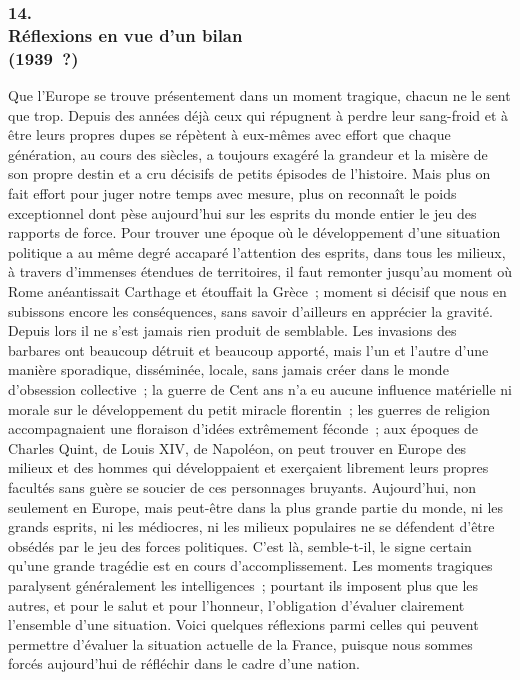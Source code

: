 \documentclass[french,twoside]{book} %
\begin{document}
\subsubsection[14. Réflexions en vue d’un bilan, (1939 ?)]{14. \\
Réflexions en vue d’un bilan \\
(1939 ?)}
\noindent \par
Que l'Europe se trouve présentement dans un moment tragique, chacun ne le sent que trop. Depuis des années déjà ceux qui répugnent à perdre leur sang-froid et à être leurs propres dupes se répètent à eux-mêmes avec effort que chaque génération, au cours des siècles, a toujours exagéré la grandeur et la misère de son propre destin et a cru décisifs de petits épisodes de l'histoire. Mais plus on fait effort pour juger notre temps avec mesure, plus on reconnaît le poids exceptionnel dont pèse aujourd'hui sur les esprits du monde entier le jeu des rapports de force. Pour trouver une époque où le développement d'une situation politique a au même degré accaparé l'attention des esprits, dans tous les milieux, à travers d'immenses étendues de territoires, il faut remonter jusqu'au moment où Rome anéantissait Carthage et étouffait la Grèce ; moment si décisif que nous en subissons encore les conséquences, sans savoir d'ailleurs en apprécier la gravité. Depuis lors il ne s'est jamais rien produit de semblable. Les invasions des barbares ont beaucoup détruit et beaucoup apporté, mais l'un et l'autre d'une manière sporadique, disséminée, locale, sans jamais créer dans le monde d'obsession collective ; la guerre de Cent ans n'a eu aucune influence matérielle ni morale sur le développement du petit miracle florentin ; les guerres de religion accompagnaient une floraison d'idées extrêmement féconde ; aux époques de Charles Quint, de Louis XIV, de Napoléon, on peut trouver en Europe des milieux et des hommes qui développaient et exerçaient librement leurs propres facultés sans guère se soucier de ces personnages bruyants. Aujourd'hui, non seulement en Europe, mais peut-être dans la plus grande partie du monde, ni les grands esprits, ni les médiocres, ni les milieux populaires ne se défendent d'être obsédés par le jeu des forces politiques. C'est là, semble-t-il, le signe certain qu'une grande tragédie est en cours d'accomplissement. Les moments tragiques paralysent généralement les intelligences ; pourtant ils imposent plus que les autres, et pour le salut et pour l'honneur, l'obligation d'évaluer clairement l'ensemble d'une situation. Voici quelques réflexions parmi celles qui peuvent permettre d'évaluer la situation actuelle de la France, puisque nous sommes forcés aujourd'hui de réfléchir dans le cadre d'une nation.\par
\end{document}
